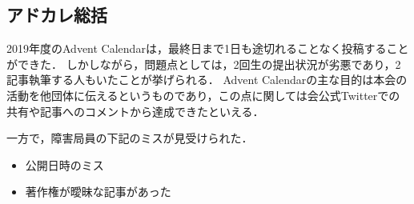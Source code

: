 \subsection*{アドカレ総括}


2019年度のAdvent Calendarは，最終日まで1日も途切れることなく投稿することができた．
しかしながら，問題点としては，2回生の提出状況が劣悪であり，2記事執筆する人もいたことが挙げられる．
Advent Calendarの主な目的は本会の活動を他団体に伝えるというものであり，この点に関しては会公式Twitterでの共有や記事へのコメントから達成できたといえる．

一方で，障害局員の下記のミスが見受けられた．
\begin{itemize}
\item 公開日時のミス
\item 著作権が曖昧な記事があった
\end{itemize}

